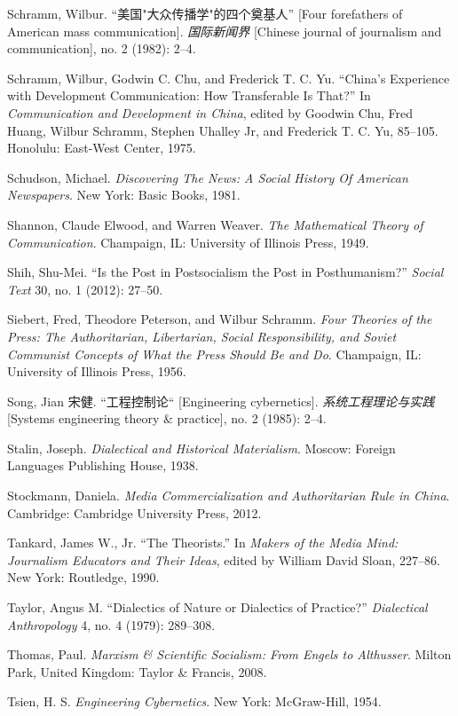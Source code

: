 \documentclass{tufte-handout}
\begin{document}
\begin{CJK*}{UTF8}{gbsn}
\begin{hangparas}{.25in}{1}
\begin{CJK*}{UTF8}{gbsn}
Schramm, Wilbur. ``美国"大众传播学"的四个奠基人'' {[}Four forefathers of
American mass communication{]}. \emph{国际新闻界} {[}Chinese journal of
journalism and communication{]}, no. 2 (1982): 2--4.

Schramm, Wilbur, Godwin C. Chu, and Frederick T. C. Yu. ``China's
Experience with Development Communication: How Transferable Is That?''
In \emph{Communication and Development in China}, edited by Goodwin Chu,
Fred Huang, Wilbur Schramm, Stephen Uhalley Jr, and Frederick T. C. Yu,
85--105. Honolulu: East-West Center, 1975.

Schudson, Michael. \emph{Discovering The News: A Social History Of
American Newspapers}. New York: Basic Books, 1981.

Shannon, Claude Elwood, and Warren Weaver. \emph{The Mathematical Theory
of Communication}. Champaign, IL: University of Illinois Press, 1949.

Shih, Shu-Mei. ``Is the Post in Postsocialism the Post in
Posthumanism?'' \emph{Social Text} 30, no. 1 (2012): 27--50.

Siebert, Fred, Theodore Peterson, and Wilbur Schramm. \emph{Four
Theories of the Press: The Authoritarian, Libertarian, Social
Responsibility, and Soviet Communist Concepts of What the Press Should
Be and Do}. Champaign, IL: University of Illinois Press, 1956.

Song, Jian 宋健. ``工程控制论`` {[}Engineering cybernetics{]}.
\emph{系统工程理论与实践} {[}Systems engineering theory \& practice{]},
no. 2 (1985): 2--4.

Stalin, Joseph. \emph{Dialectical and Historical Materialism}. Moscow:
Foreign Languages Publishing House, 1938.

Stockmann, Daniela. \emph{Media Commercialization and Authoritarian Rule
in China}. Cambridge: Cambridge University Press, 2012.

Tankard, James W., Jr. ``The Theorists.'' In \emph{Makers of the Media
Mind: Journalism Educators and Their Ideas}, edited by William David
Sloan, 227--86. New York: Routledge, 1990.

Taylor, Angus M. ``Dialectics of Nature or Dialectics of Practice?''
\emph{Dialectical Anthropology} 4, no. 4 (1979): 289--308.

Thomas, Paul. \emph{Marxism \& Scientific Socialism: From Engels to
Althusser}. Milton Park, United Kingdom: Taylor \& Francis, 2008.

Tsien, H. S. \emph{Engineering Cybernetics}. New York: McGraw-Hill,
1954.


\end{CJK*}
\end{hangparas}
\end{CJK*}
\end{document}
